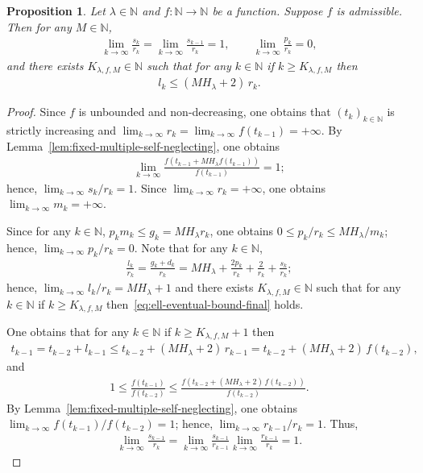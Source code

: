 \documentclass[10pt,a4paper]{amsart}
\newtheorem{prop}{Proposition}
\begin{document}
\begin{prop}
\label{prop:scale-inputs-final}
Let $\lambda\in\mathbb{N}$ and $f:\mathbb{N}\to\mathbb{N}$ be a function. 
Suppose $f$ is admissible. Then for any $M\in\mathbb{N}$,
\begin{align}
\label{eq:scale-inputs-final}
    \lim_{k\to\infty}\frac{s_k}{r_k}
    =\lim_{k\to\infty}\frac{s_{k-1}}{r_k}
    =1,
    \qquad
    \lim_{k\to\infty}\frac{p_k}{r_k}=0,
\end{align}
and there exists $K_{\lambda,f,M}\in\mathbb{N}$ such that for any $k\in\mathbb{N}$ if $k\geq K_{\lambda,f,M}$ then
\begin{align}
\label{eq:ell-eventual-bound-final}
    l_k\leq (MH_\lambda+2)\,r_k.
\end{align}
\end{prop}
\begin{proof}
Since $f$ is unbounded and non-decreasing, one obtains that $(t_k)_{k\in\mathbb{N}}$ is strictly increasing and $\lim_{k\to\infty}r_k=\lim_{k\to\infty}f(t_{k-1})=+\infty$. By Lemma~\ref{lem:fixed-multiple-self-neglecting}, one obtains
\begin{align*}
    \lim_{k\to\infty}\frac{f(t_{k-1}+MH_\lambda f(t_{k-1}))}{f(t_{k-1})}=1;
\end{align*}
hence, $\lim_{k\to\infty}{s_k}/{r_k}=1$. Since $\lim_{k\to\infty}r_k=+\infty$, one obtains $\lim_{k\to\infty}m_k=+\infty$.

Since for any $k\in\mathbb{N}$, $p_km_k\leq g_k=MH_\lambda r_k$, one obtains $0\leq {p_k}/{r_k}\leq {MH_\lambda}/{m_k}$; hence, $\lim_{k\to\infty}{p_k}/{r_k}=0$. Note that for any $k\in\mathbb{N}$,
\begin{align*}
    \frac{l_k}{r_k}
    =
    \frac{g_k+d_k}{r_k}
    =
    MH_\lambda+\frac{2p_k}{r_k}+\frac{2}{r_k}+\frac{s_k}{r_k};
\end{align*}
hence, $\lim_{k\to\infty}{l_k}/{r_k}=MH_\lambda+1$ and there exists $K_{\lambda,f,M}\in\mathbb{N}$ such that for any $k\in\mathbb{N}$ if $k\geq K_{\lambda,f,M}$ then~\eqref{eq:ell-eventual-bound-final} holds.

One obtains that for any $k\in\mathbb{N}$ if $k\geq K_{\lambda,f,M}+1$ then 
\begin{align*}
    t_{k-1}
    =t_{k-2}+l_{k-1}
    \leq t_{k-2}+(MH_\lambda+2)\,r_{k-1}
    =t_{k-2}+(MH_\lambda+2)\,f(t_{k-2}),
\end{align*}
and
\begin{align*}
    1\leq \frac{f(t_{k-1})}{f(t_{k-2})}\le
    \frac{f(t_{k-2}+(MH_\lambda+2)\,f(t_{k-2}))}{f(t_{k-2})}.
\end{align*}
By Lemma~\ref{lem:fixed-multiple-self-neglecting}, one obtains $\lim_{k\to\infty}{f(t_{k-1})}/{f(t_{k-2})}=1$; hence, $\lim_{k\to\infty}{r_{k-1}}/{r_k}=1$. Thus,
\begin{align*}
    \lim_{k\to\infty}\frac{s_{k-1}}{r_k}
    =\lim_{k\to\infty}\frac{s_{k-1}}{r_{k-1}}\lim_{k\to\infty}\frac{r_{k-1}}{r_k}
    =1.
\end{align*}
\end{proof}
\end{document}
